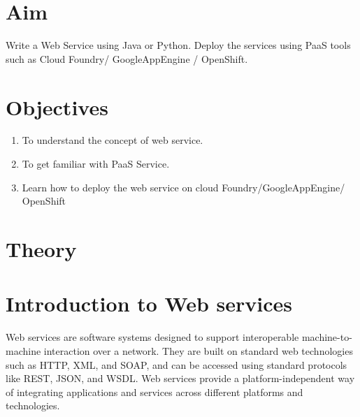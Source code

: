 \documentclass[11pt]{article}
\begin{document}
\tableofcontents
\thispagestyle{empty}
\clearpage

\setcounter{page}{1}

\section{Aim}
Write a Web Service using Java or Python. Deploy the services using PaaS tools such as
Cloud Foundry/ GoogleAppEngine / OpenShift.

\section{Objectives}
\begin{enumerate}
    \item To understand the concept of web service.
    \item To get familiar with PaaS Service.
    \item Learn how to deploy the web service on cloud Foundry/GoogleAppEngine/ OpenShift
\end{enumerate}

\section{Theory}

\section{Introduction to Web services}

Web services are software systems designed to support interoperable machine-to-machine interaction over a network. They are built on standard web technologies such as HTTP, XML, and SOAP, and can be accessed using standard protocols like REST, JSON, and WSDL. Web services provide a platform-independent way of integrating applications and services across different platforms and technologies.
\end{document}
